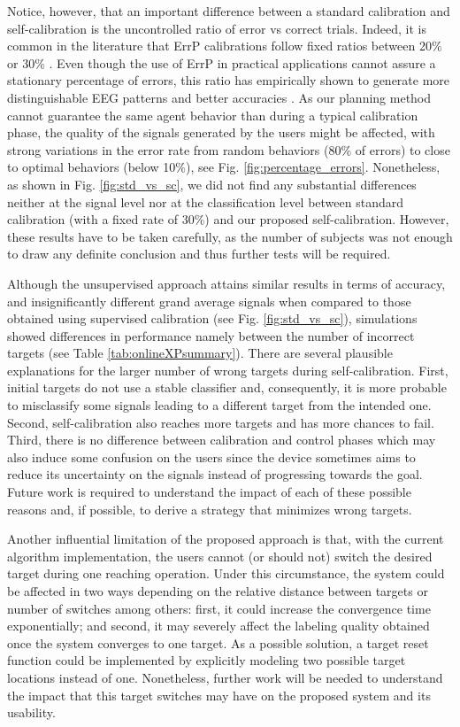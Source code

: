 Notice, however, that an important difference between a standard calibration and self-calibration is the uncontrolled ratio of error vs correct trials. Indeed, it is common in the literature that ErrP calibrations follow fixed ratios between 20\% or 30\% \cite{chavarriaga2010learning, iturrate13}. Even though the use of ErrP in practical applications cannot assure a stationary percentage of errors, this ratio has empirically shown to generate more distinguishable EEG patterns and  better accuracies \cite{chavarriaga2010learning}. As our planning method cannot guarantee the same agent behavior than during a typical calibration phase, the quality of the signals generated by the users might be affected, with strong variations in the error rate from random behaviors (80\% of errors) to close to optimal behaviors (below 10\%), see Fig. \ref{fig:percentage_errors}. Nonetheless, as shown in Fig. \ref{fig:std_vs_sc}, we did not find any substantial differences neither at the signal level nor at the classification level between standard calibration (with a fixed rate of 30\%) and our proposed self-calibration. However, these results have to be taken carefully, as the number of subjects was not enough to draw any definite conclusion and thus further tests will be required.

Although the unsupervised approach attains similar results in terms of accuracy, and insignificantly different grand average signals when compared to those obtained using supervised calibration (see Fig. \ref{fig:std_vs_sc}), simulations showed differences in performance namely between the number of incorrect targets (see Table \ref{tab:onlineXPsummary}). There are several plausible explanations for the larger number of wrong targets during self-calibration. First, initial targets do not use a stable classifier and, consequently, it is more probable to misclassify some signals leading to a different target from the intended one. Second, self-calibration also reaches more targets and has more chances to fail. Third, there is no difference between calibration and control phases which may also induce some confusion on the users since the device sometimes aims to reduce its uncertainty on the signals instead of progressing towards the goal. Future work is required to understand the impact of each of these possible reasons and, if possible, to derive a strategy that minimizes wrong targets.

Another influential limitation of the proposed approach is that, with the current algorithm implementation, the users cannot (or should not) switch the desired target during one reaching operation. Under this circumstance, the system could be affected in two ways depending on the relative distance between targets or number of switches among others: first, it could increase the convergence time exponentially; and second, it may severely affect the labeling quality obtained once the system converges to one target. As a possible solution, a target reset function could be implemented by explicitly modeling two possible target locations instead of one. Nonetheless, further work will be needed to understand the impact that this target switches may have on the proposed system and its usability.

